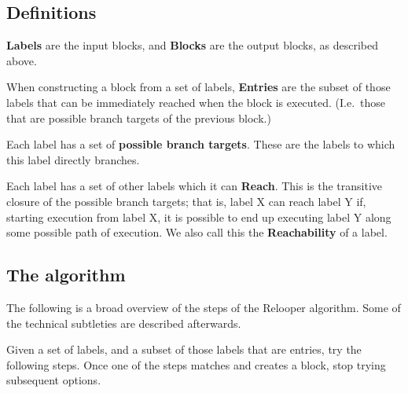 \documentclass[10pt, a4paper]{article}
\begin{document}
\subsection{Definitions}

\textbf{Labels} are the input blocks, and \textbf{Blocks} are the output blocks, as described above.

When constructing a block from a set of labels, \textbf{Entries} are the subset of those labels that can be immediately reached when the block is executed. (I.e.\ those that are possible branch targets of the previous block.)

Each label has a set of \textbf{possible branch targets}. These are the labels to which this label directly branches.

Each label has a set of other labels which it can \textbf{Reach}. This is the transitive closure of the possible branch targets; that is, label X can reach label Y if, starting execution from label X, it is possible to end up executing label Y along some possible path of execution.
We also call this the \textbf{Reachability} of a label.

\subsection{The algorithm}

The following is a broad overview of the steps of the Relooper algorithm. Some of the technical subtleties are described afterwards.

Given a set of labels, and a subset of those labels that are entries, try the following steps. Once one of the steps matches and creates a block, stop trying subsequent options.
\end{document}
